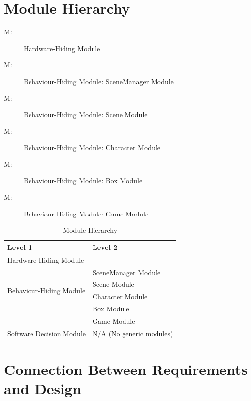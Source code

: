 \documentclass[12pt, titlepage]{article}
\newcounter{mnum}
\newcommand{\mthemnum}{M\themnum}
\begin{document}
\section{Module Hierarchy} \label{SecMH}

\begin{description}
    \item [ \mthemnum \label{m1}:] Hardware-Hiding Module
    \item [ \mthemnum \label{m2}:] Behaviour-Hiding Module: SceneManager Module
     \item [ \mthemnum \label{m3}:] Behaviour-Hiding Module: Scene Module
    \item [ \mthemnum \label{m4}:] Behaviour-Hiding Module: Character Module
    \item [ \mthemnum \label{m5}:] Behaviour-Hiding Module: Box Module
    \item [ \mthemnum \label{m6}:] Behaviour-Hiding Module: Game Module
\end{description}

\begin{table}[h!]
\centering
\begin{tabular}{p{} p{}}
\toprule
\textbf{Level 1} & \textbf{Level 2}\\
\midrule

{Hardware-Hiding Module} & ~ \\
\midrule

\multirow{4}{0.3\textwidth}{Behaviour-Hiding Module} & SceneManager Module \\
& Scene Module \\
& Character Module\\
& Box Module\\
& Game Module\\
\midrule

\multirow{1}{0.3\textwidth}{Software Decision Module} & N/A (No generic modules) \\
\bottomrule

\end{tabular}
\caption{Module Hierarchy}
\label{TblMH}
\end{table}

\section{Connection Between Requirements and Design} \label{SecConnection}
\end{document}
